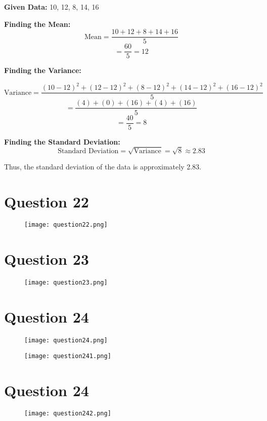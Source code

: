 \documentclass[11pt]{article}
\begin{document}
\textbf{Given Data:} 10, 12, 8, 14, 16

\textbf{Finding the Mean:}
\[
\text{Mean} = \frac{10 + 12 + 8 + 14 + 16}{5}
\]
\[
= \frac{60}{5} = 12
\]

\textbf{Finding the Variance:}

\[
\text{Variance} = \frac{(10 - 12)^2 + (12 - 12)^2 + (8 - 12)^2 + (14 - 12)^2 + (16 - 12)^2}{5}
\]
\[
= \frac{(4) + (0) + (16) + (4) + (16)}{5}
\]
\[
= \frac{40}{5} = 8
\]

\textbf{Finding the Standard Deviation:}
\[
\text{Standard Deviation} = \sqrt{\text{Variance}} = \sqrt{8} \approx 2.83
\]

Thus, the standard deviation of the data is approximately 2.83.

\clearpage
\section*{Question 22}
\begin{figure}[h]
    \centering
    \texttt{[image: question22.png]}
\end{figure}




\section*{Question 23}
\begin{figure}[h]
    \centering
    \texttt{[image: question23.png]}
\end{figure}


\clearpage



\section*{Question 24}
\begin{figure}[h]
    \centering
    \texttt{[image: question24.png]}
\end{figure}

\begin{figure}[h]
    \centering
    \texttt{[image: question241.png]}
\end{figure}
\clearpage

\section*{Question 24}
\begin{figure}[h]
    \centering
    \texttt{[image: question242.png]}
\end{figure}
\end{document}
